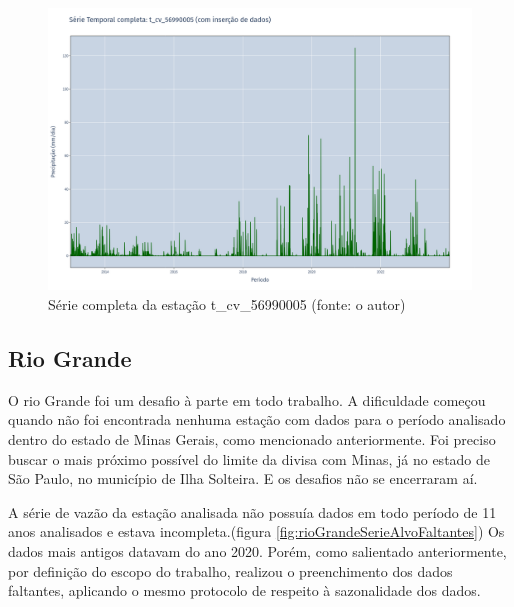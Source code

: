 \begin{figure}[!h]
\centering
\includegraphics[scale=0.25]{Figuras/rio_doce/rioDoceSerie_t_cv_56990005_completa.png}
\caption{Série completa da estação t\_cv\_56990005 (fonte: o autor)}
\label{fig:rioDoceSerie_t_cv_56990005_completa}
\end{figure}

\subsection{Rio Grande}

O rio Grande foi um desafio à parte em todo trabalho. A dificuldade começou quando não foi encontrada nenhuma estação com dados para o período analisado dentro do estado de Minas Gerais, como mencionado anteriormente. Foi preciso buscar o mais próximo possível do limite da divisa com Minas, já no estado de São Paulo, no município de Ilha Solteira. E os desafios não se encerraram aí.

A série de vazão da estação analisada não possuía dados em todo período de 11 anos analisados e estava incompleta.(figura \ref{fig:rioGrandeSerieAlvoFaltantes}) Os dados mais antigos datavam do ano 2020. Porém, como salientado anteriormente, por definição do escopo do trabalho, realizou o preenchimento dos dados faltantes, aplicando o mesmo protocolo de respeito à sazonalidade dos dados.


